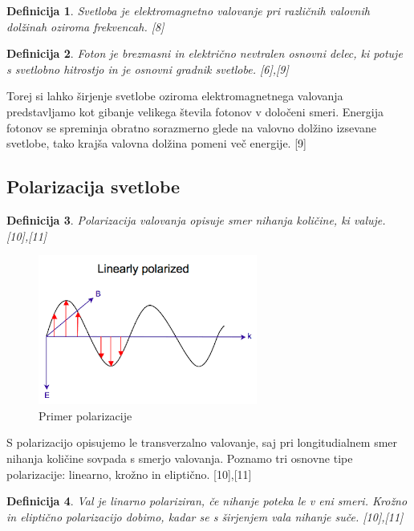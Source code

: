 \documentclass[A4paper, 11pt]{article}
\newtheorem{definicija}{Definicija}
\begin{document}
\begin{definicija}
Svetloba je elektromagnetno valovanje pri različnih valovnih dolžinah oziroma frekvencah. [8]
\end{definicija}

\begin{definicija}
Foton je brezmasni in električno nevtralen osnovni delec, ki potuje s svetlobno hitrostjo in je osnovni gradnik svetlobe. [6],[9]
\end{definicija} 

Torej si lahko širjenje svetlobe oziroma elektromagnetnega valovanja predstavljamo kot gibanje velikega števila fotonov v določeni smeri. Energija fotonov se spreminja obratno sorazmerno glede na valovno dolžino izsevane svetlobe, tako krajša valovna dolžina pomeni več energije. [9]

\subsection{Polarizacija svetlobe}

\begin{definicija}
Polarizacija valovanja opisuje smer nihanja količine, ki valuje. [10],[11]
\end{definicija}

\begin{figure}[h]
\centering
\caption{Primer polarizacije}
\includegraphics[scale=0.75]{images}
\end{figure}

S polarizacijo opisujemo le transverzalno valovanje, saj pri longitudialnem smer nihanja količine sovpada s smerjo valovanja. Poznamo tri osnovne tipe polarizacije: linearno, krožno in eliptično. [10],[11]

\begin{definicija}
Val je linarno polariziran, če nihanje poteka le v eni smeri. Krožno in eliptično polarizacijo dobimo, kadar se s širjenjem vala nihanje suče. [10],[11]
\end{definicija}
\end{document}
